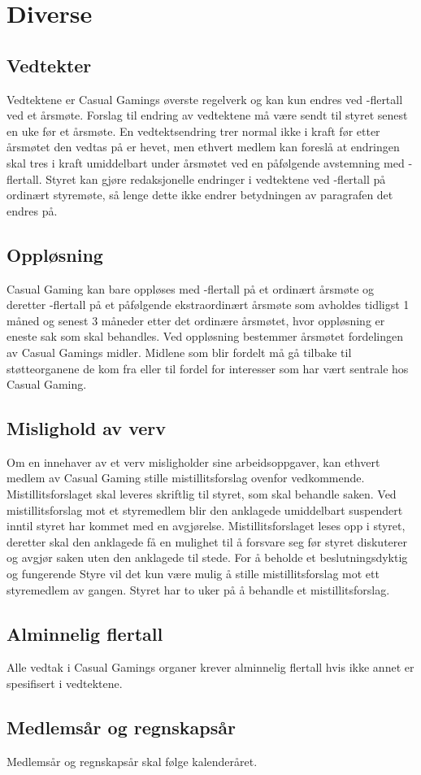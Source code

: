 \chapter{Diverse}

\emptychapterspacing

\section{Vedtekter}
Vedtektene er Casual Gamings øverste regelverk og kan kun endres ved -flertall ved et årsmøte. Forslag til endring av vedtektene må være sendt til styret senest en uke før et årsmøte. En vedtektsendring trer normal ikke i kraft før etter årsmøtet den vedtas på er hevet, men ethvert medlem kan foreslå at endringen skal tres i kraft umiddelbart under årsmøtet ved en påfølgende avstemning med -flertall. Styret kan gjøre redaksjonelle endringer i vedtektene ved -flertall på ordinært styremøte, så lenge dette ikke endrer betydningen av paragrafen det endres på.

\section{Oppløsning}
Casual Gaming kan bare oppløses med -flertall på et ordinært årsmøte og deretter -flertall på et påfølgende ekstraordinært årsmøte som avholdes tidligst 1 måned og senest 3 måneder etter det ordinære årsmøtet, hvor oppløsning er eneste sak som skal behandles. Ved oppløsning bestemmer årsmøtet fordelingen av Casual Gamings midler. Midlene som blir fordelt må gå tilbake til støtteorganene de kom fra eller til fordel for interesser som har vært sentrale hos Casual Gaming.

\section{Mislighold av verv}
Om en innehaver av et verv misligholder sine arbeidsoppgaver, kan ethvert medlem av Casual Gaming stille mistillitsforslag ovenfor vedkommende. Mistillitsforslaget skal leveres skriftlig til styret, som skal behandle saken. Ved mistillitsforslag mot et styremedlem blir den anklagede umiddelbart suspendert inntil styret har kommet med en avgjørelse. Mistillitsforslaget leses opp i styret, deretter skal den anklagede få en mulighet til å forsvare seg før styret diskuterer og avgjør saken uten den anklagede til stede. For å beholde et beslutningsdyktig og fungerende Styre vil det kun være mulig å stille mistillitsforslag mot ett styremedlem av gangen. Styret har to uker på å behandle et mistillitsforslag.

\section{Alminnelig flertall}
Alle vedtak i Casual Gamings organer krever alminnelig flertall hvis ikke annet er spesifisert i vedtektene.

\section{Medlemsår og regnskapsår}
Medlemsår og regnskapsår skal følge kalenderåret.
